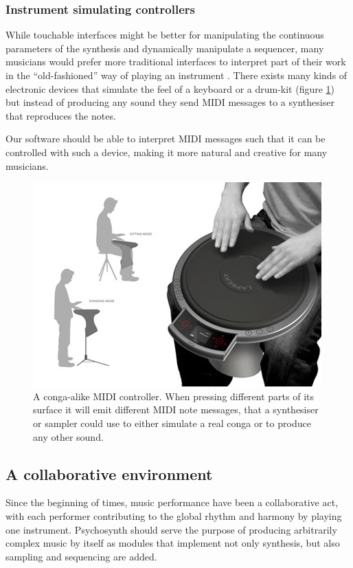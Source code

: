 \subsubsection{Instrument simulating controllers}

While touchable interfaces might be better for manipulating the
continuous parameters of the synthesis and dynamically manipulate a
sequencer, many musicians would prefer more traditional interfaces to
interpret part of their work in the ``old-fashioned'' way of playing
an instrument \cite{magnusson07acoustic}. There exists many kinds of
electronic devices that simulate the feel of a keyboard or a drum-kit
(figure \ref{fig:midicontrol}) but instead of producing any sound they
send MIDI \cite{completemidi} messages to a synthesiser that reproduces
the notes.

Our software should be able to interpret MIDI messages such that it
can be controlled with such a device, making it more natural and
creative for many musicians.

\begin{figure}[h!]
\centering
\includegraphics[width=.6\textwidth]{pic/lapbeat.jpg}
\caption[A conga-alike MIDI controller.]{A conga-alike MIDI
  controller. When pressing different parts of its surface it will
  emit different MIDI note messages, that a synthesiser or sampler
  could use to either simulate a real conga or to produce any other
  sound.}
\label{fig:midicontrol}
\end{figure}

\subsection{A collaborative environment}

Since the beginning of times, music performance have been a
collaborative act, with each performer contributing to the global
rhythm and harmony by playing one instrument. Psychosynth should serve
the purpose of producing arbitrarily complex music by itself as
modules that implement not only synthesis, but also sampling and
sequencing are added.

